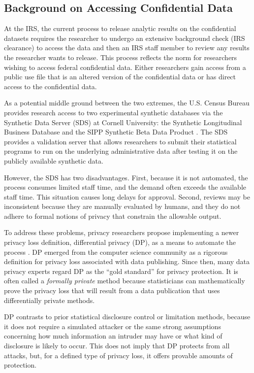 \subsection{Background on Accessing Confidential Data}\label{subsec:background}
At the IRS, the current process to release analytic results on the confidential datasets requires the researcher to undergo an extensive background check (IRS clearance) to access the data and then an IRS staff member to review any results the researcher wants to release. This process reflects the norm for researchers wishing to access federal confidential data. Either researchers gain access from a public use file that is an altered version of the confidential data or has direct access to the confidential data.

As a potential middle ground between the two extremes, the U.S. Census Bureau provides research access to two experimental synthetic databases via the Synthetic Data Server (SDS) at Cornell University: the Synthetic Longitudinal Business Database and the SIPP Synthetic Beta Data Product \citep{benedetto2013creation,drechsler2014synthetic}. The SDS provides a validation server that allows researchers to submit their statistical programs to run on the underlying administrative data after testing it on the publicly available synthetic data.

However, the SDS has two disadvantages. First, because it is not automated, the process consumes limited staff time, and the demand often exceeds the available staff time. This situation causes long delays for approval. Second, reviews may be inconsistent because they are manually evaluated by humans, and they do not adhere to formal notions of privacy that constrain the allowable output.

To address these problems, privacy researchers propose implementing a newer privacy loss definition, differential privacy (DP), as a means to automate the process \citet{dwork2006calibrating}. DP emerged from the computer science community as a rigorous definition for privacy loss associated with data publishing. Since then, many data privacy experts regard DP as the ``gold standard'' for privacy protection. It is often called a \textit{formally private} method because statisticians can mathematically prove the privacy loss that will result from a data publication that uses differentially private methods.

DP contrasts to prior statistical disclosure control or limitation methods, because it does not require a simulated attacker or the same strong assumptions concerning how much information an intruder may have or what kind of disclosure is likely to occur. This does not imply that DP protects from all attacks, but, for a defined type of privacy loss, it offers provable amounts of protection.


